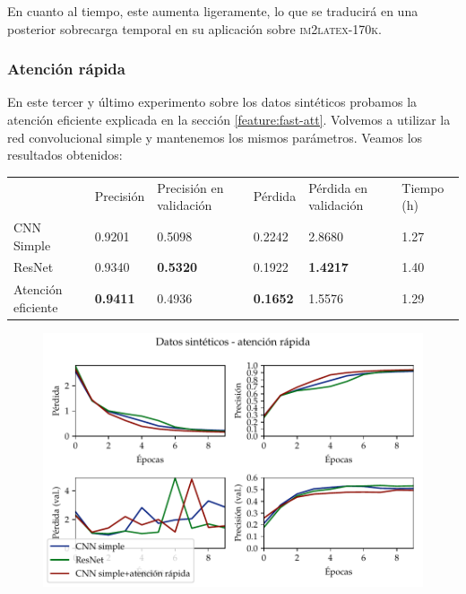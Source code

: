 \documentclass[a4paper, 20pt, dvipsnames]{article}
\begin{document}
En cuanto al tiempo, este aumenta ligeramente, lo que se traducirá en una
posterior sobrecarga temporal en su aplicación sobre \textsc{im2latex-170k}.


\subsubsection{Atención rápida}
\label{exp:toy3}

En este tercer y último experimento sobre los datos sintéticos probamos la
atención eficiente explicada en la sección \ref{feature:fast-att}. Volvemos a
utilizar la red convolucional simple y mantenemos los mismos parámetros. Veamos
los resultados obtenidos:

\begin{table}[h]
	\centering
	\begin{tabular}{llllll}
		& Precisión       & Precisión en validación & Pérdida         & Pérdida en validación & Tiempo (h) \\ \cline{2-6} 
		CNN Simple         & 0.9201          & 0.5098                  & 0.2242          & 2.8680                & 1.27       \\
		ResNet             & 0.9340          & \textbf{0.5320}         & 0.1922          & \textbf{1.4217}       & 1.40       \\
		Atención eficiente & \textbf{0.9411} & 0.4936                  & \textbf{0.1652} & 1.5576                & 1.29      
	\end{tabular}
\end{table}

\begin{figure}[H]
	\centering
	\includegraphics{fig/toy-3.pdf}
\end{figure}
\end{document}
